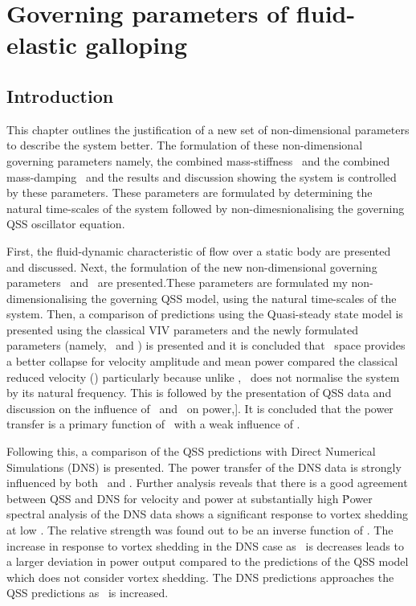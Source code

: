 \chapter{Governing parameters of  fluid-elastic galloping}
\label{chap:goven_para}

\section{Introduction}

This chapter outlines the justification of a new set of non-dimensional parameters to describe the system better. The formulation of these non-dimensional governing parameters namely, the combined mass-stiffness \massstiff \ and the combined mass-damping \massdamp \ and the results and discussion showing the system is controlled by these parameters. These parameters are formulated by determining the natural time-scales of the system followed by non-dimesnionalising the governing QSS oscillator equation.  

First, the fluid-dynamic characteristic of flow over a static body are presented and discussed. Next, the formulation of the new non-dimensional governing parameters \massstiff\ and \massdamp\ are presented.These parameters are formulated my non-dimensionalising the governing QSS model, using the natural time-scales of the system. Then, a comparison of predictions using the Quasi-steady state model is presented using the classical VIV parameters and the newly formulated parameters (namely, \massstiff \ and \massdamp) is presented and it is concluded that \massdamp\ space provides a better collapse for velocity amplitude and mean power compared the classical reduced velocity (\ustar) particularly because unlike \ustar, \massdamp\ does not normalise the system by its natural frequency. This is followed by the presentation of QSS data and discussion on the influence of \massstiff \ and \massdamp \ on power,]. It is concluded that the power transfer is a primary function of \massdamp \ with a weak influence of \massstiff.

Following this, a comparison of the QSS predictions with Direct Numerical Simulations (DNS) is presented. The power transfer of the DNS data is strongly influenced by both \massstiff \ and \massdamp. Further analysis reveals that there is a good agreement between QSS and DNS for velocity and power at substantially high \massstiff\. Power spectral analysis of the DNS data shows a significant response to vortex shedding at low \massstiff. The relative strength was found out to be an inverse function of \massstiff. The increase in response to vortex shedding in the DNS case as \massstiff\ is decreases leads to a larger deviation in power output compared to the predictions of the QSS model which does not consider vortex shedding. The DNS predictions approaches the QSS predictions as \massstiff\ is increased.  


